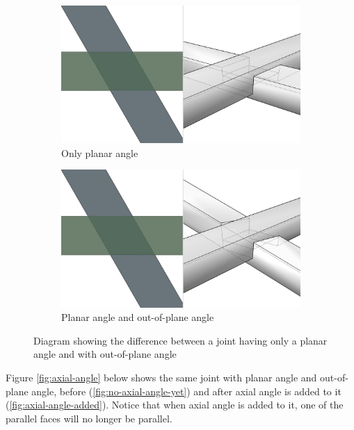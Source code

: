 \begin{figure}[!h]
    \centering
    \begin{subfigure}[b]{0.49\textwidth}
        \centering
        \includegraphics[width=\textwidth]{images/7a/img17.jpg}
        \caption{Only planar angle}
        \label{fig:only-planar-angle}
    \end{subfigure}
    \hfill
    \begin{subfigure}[b]{0.49\textwidth}
        \centering
        \includegraphics[width=\textwidth]{images/7a/img18.jpg}
        \caption{Planar angle and out-of-plane angle}
        \label{fig:and-out-of-plane-angle}
    \end{subfigure}
    \caption{Diagram showing the difference between a joint having only a planar angle and with out-of-plane angle}
    \label{fig:difference-out-of-plane-angle}
\end{figure}

Figure \ref{fig:axial-angle} below shows the same joint with planar angle and out-of-plane angle, before (\ref{fig:no-axial-angle-yet}) and after axial angle is added to it (\ref{fig:axial-angle-added}). Notice that when axial angle is added to it, one of the parallel faces will no longer be parallel. 

